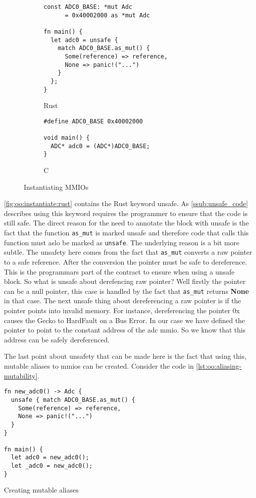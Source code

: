 \begin{figure}[H]

  \begin{subfigure}{0.31\textwidth}
    \begin{verbatim}
const ADC0_BASE: *mut Adc
      = 0x40002000 as *mut Adc

fn main() {
  let adc0 = unsafe {
    match ADC0_BASE.as_mut() {
      Some(reference) => reference,
      None => panic!("...")
    }
  };
}
    \end{verbatim}
    \caption{Rust}
    \label{fig:oo:instantiate:rust}
  \end{subfigure}
  \hfill
  \begin{subfigure}{0.31\textwidth}
    \begin{verbatim}
#define ADC0_BASE 0x40002000

void main() {
  ADC* adc0 = (ADC*)ADC0_BASE;
}
    \end{verbatim}
        \caption{C}
    \label{fig:oo:instantiate:c}
  \end{subfigure}
  \caption{Instantiating MMIOs}
  \label{fig:oo:instantiate}

\end{figure}

\autoref{fig:oo:instantiate:rust} contains the Rust keyword unsafe.
As \autoref{ssub:unsafe_code} describes using this keyword requires the programmer to ensure that the code is still safe.
The direct reason for the need to annotate the block with unsafe is the fact that the function \texttt{as\_mut} is marked unsafe and therefore code that calls this function must aslo be marked as \texttt{unsafe}.
The underlying reason is a bit more subtle.
The unsafety here comes from the fact that \texttt{as\_mut} converts a raw pointer to a safe reference.
After the conversion the pointer must be safe to dereference.
This is the programmars part of the contract to ensure when using a unsafe block.
So what is unsafe about derefencing raw pointer?
Well firstly the pointer can be a null pointer, this case is handled by the fact that \texttt{as\_mut} returns \textbf{None} in that case.
The next unsafe thing about dereferencing a raw pointer is if the pointer points into invalid memory.
For instance, dereferencing the pointer 0x  causes the Gecko to HardFault on a Bus Error.
In our case we have defined the pointer to point to the constant address of the \gls{adc} \gls{mmio}.
So we know that this address can be safely dereferenced.

The last point about unsafety that can be made here is the fact that using this, mutable aliases to \gls{mmio}s can be created.
Consider the code in \autoref{lst:oo:aliasing-mutability}.

\begin{listing}[H]
  \begin{verbatim}
fn new_adc0() -> Adc {
  unsafe { match ADC0_BASE.as_mut() {
    Some(reference) => reference,
    None => panic!("...")
  }
}

fn main() {
  let adc0 = new_adc0();
  let _adc0 = new_adc0();
}
  \end{verbatim}
  \caption{Creating mutable aliases}
  \label{lst:oo:aliasing-mutability}
\end{listing}
